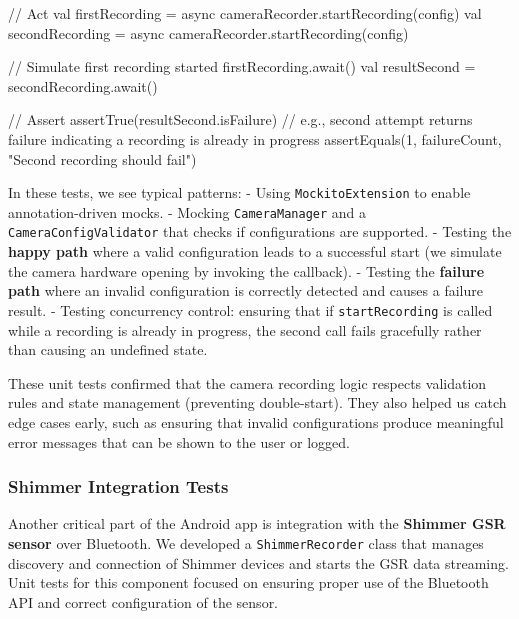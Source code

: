 {{            // Act
            val firstRecording = async { cameraRecorder.startRecording(config) }
            val secondRecording = async { cameraRecorder.startRecording(config) }

            // Simulate first recording started
            firstRecording.await()
            val resultSecond = secondRecording.await()

            // Assert
            assertTrue(resultSecond.isFailure) 
            // e.g., second attempt returns failure indicating a recording is already in progress
            assertEquals(1, failureCount, "Second recording should fail")
        }
    }

In these tests, we see typical patterns: - Using \texttt{MockitoExtension} to
enable annotation-driven mocks. - Mocking \texttt{CameraManager} and a
\texttt{CameraConfigValidator} that checks if configurations are supported. -
Testing the \textbf{happy path} where a valid configuration leads to a
successful start (we simulate the camera hardware opening by invoking
the callback). - Testing the \textbf{failure path} where an invalid
configuration is correctly detected and causes a failure result. -
Testing concurrency control: ensuring that if \texttt{startRecording} is called
while a recording is already in progress, the second call fails
gracefully rather than causing an undefined state.

These unit tests confirmed that the camera recording logic respects
validation rules and state management (preventing double-start). They
also helped us catch edge cases early, such as ensuring that invalid
configurations produce meaningful error messages that can be shown to
the user or logged.

\subsubsection{Shimmer Integration Tests}

Another critical part of the Android app is integration with the
\textbf{Shimmer GSR sensor} over Bluetooth. We developed a \texttt{ShimmerRecorder}
class that manages discovery and connection of Shimmer devices and
starts the GSR data streaming. Unit tests for this component focused on
ensuring proper use of the Bluetooth API and correct configuration of
the sensor.

